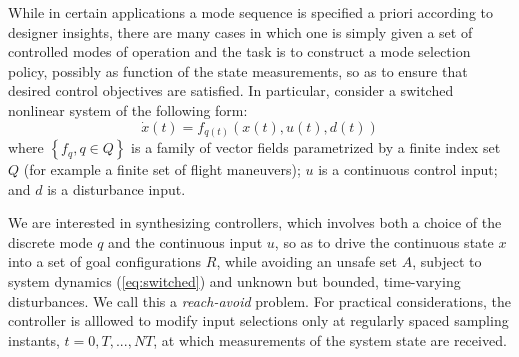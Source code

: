                While in certain applications a mode sequence is
               specified a priori according to designer insights,
               there are many cases in which one is simply given a set
               of controlled modes of operation and the task is to
               construct a mode selection policy, possibly as function
               of the state measurements, so as to ensure that desired
               control objectives are satisfied.  In particular,
               consider a switched nonlinear system of the following
               form:
               \begin{equation}
                 \label{eq:switched}
                 \dot{x}(t) = f_{q(t)}(x(t), u(t), d(t))
               \end{equation}
               where $\left\{f_q, q \in Q\right\}$ is a family of
               vector fields parametrized by a finite index set $Q$
               (for example a finite set of flight maneuvers); $u$ is
               a continuous control input; and $d$ is a disturbance
               input.

               We are interested in synthesizing controllers, which
               involves both a choice of the discrete mode $q$ and the
               continuous input $u$, so as to drive the continuous
               state $x$ into a set of goal configurations $R$, while
               avoiding an unsafe set $A$, subject to system dynamics
               (\ref{eq:switched}) and unknown but bounded,
               time-varying disturbances.  We call this a
               \textit{reach-avoid} problem.  For practical
               considerations, the controller is alllowed to modify
               input selections only at regularly spaced sampling
               instants, $t=0,T,...,NT$, at which measurements of the
               system state are received.

